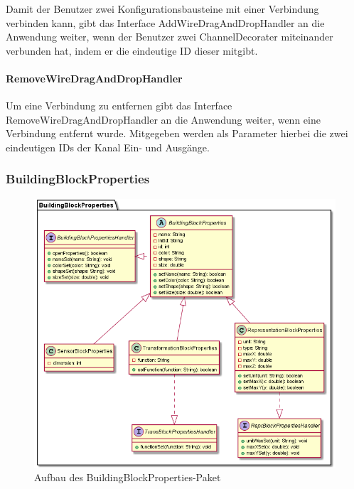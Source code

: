 \documentclass[parskip=full]{scrartcl}
\begin{document}
Damit der Benutzer zwei Konfigurationsbausteine mit einer Verbindung verbinden kann, gibt das Interface AddWireDragAndDropHandler an die Anwendung weiter, wenn der Benutzer zwei ChannelDecorater miteinander verbunden hat, indem er die eindeutige ID dieser mitgibt.

\paragraph{RemoveWireDragAndDropHandler}

Um eine Verbindung zu entfernen gibt das Interface RemoveWireDragAndDropHandler an die Anwendung weiter, wenn eine Verbindung entfernt wurde. Mitgegeben werden als Parameter hierbei die zwei eindeutigen IDs der Kanal Ein- und Ausgänge.

\newpage 

\subsubsection{BuildingBlockProperties}

\begin{figure}[htbp]
	\begin{center}
		\includegraphics[width = 14cm]{Grafiken/View/BuildingBlockPropertiesNamespace.PNG}
		\caption{Aufbau des BuildingBlockProperties-Paket}
		\label{Entwurf_Grob}
	\end{center}
\end{figure}
\end{document}
